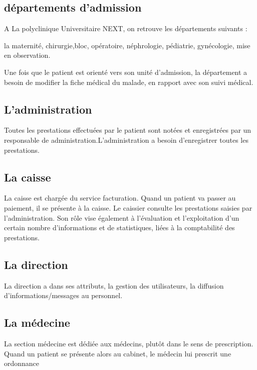 \subsection{ départements d'admission}

A La polyclinique Universitaire NEXT, on retrouve les départements suivants :

la maternité, chirurgie,bloc, opératoire,        néphrologie,  pédiatrie, gynécologie, mise en observation.

Une fois que le patient est orienté vers son unité d'admission, la département  a besoin de modifier la  fiche médical du malade, en
rapport avec son suivi médical.


\subsection{L'administration}

Toutes les prestations effectuées par le patient sont notées et enregistrées par un
responsable de administration.L'administration a besoin d'enregistrer toutes les prestations.


\subsection{La caisse}
La caisse est chargée du service facturation. Quand un patient va passer au paiement, il se
présente à la caisse. Le caissier consulte les prestations saisies par l'administration.
Son rôle vise également à l'évaluation et l'exploitation d'un certain nombre d'informations
et de statistiques, liées à la comptabilité des prestations.

\subsection{La direction}
La direction a dans ses attributs, la gestion des utilisateurs, la diffusion
d'informations/messages au personnel.

\subsection{La médecine}

La section médecine est dédiée aux médecins, plutôt dans le sens de prescription. Quand un
patient se présente alors au cabinet, le médecin lui prescrit une ordonnance










